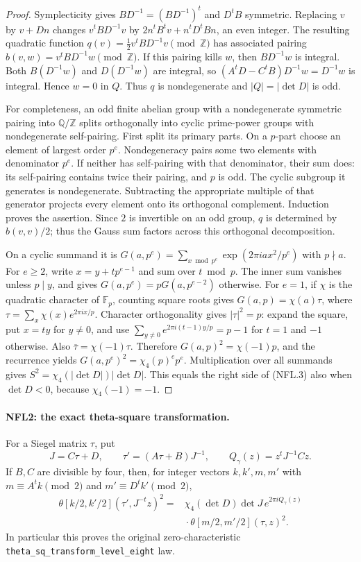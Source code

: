 \documentclass[11pt,a4paper]{article}
\numberwithin{equation}{section}
\theoremstyle{remark}\newtheorem{remark}[theorem]{Remark}
\begin{document}
\begin{proof}
Symplecticity gives $BD^{-1}=(BD^{-1})^t$ and $D^tB$ symmetric.
Replacing $v$ by $v+Dn$ changes $v^tBD^{-1}v$ by
$2n^tB^tv+n^tD^tBn$, an even integer.  The resulting quadratic
function $q(v)=\tfrac12v^tBD^{-1}v\pmod{\mathbb Z}$ has associated
pairing $b(v,w)=v^tBD^{-1}w\pmod{\mathbb Z}$.
If this pairing kills $w$, then $BD^{-1}w$ is integral.  Both
$B(D^{-1}w)$ and $D(D^{-1}w)$ are integral, so
$(A^tD-C^tB)D^{-1}w=D^{-1}w$ is integral.  Hence $w=0$ in $Q$.
Thus $q$ is nondegenerate and $|Q|=|\det D|$ is odd.

For completeness, an odd finite abelian group with a nondegenerate
symmetric pairing into $\mathbb Q/\mathbb Z$ splits orthogonally
into cyclic prime-power groups with nondegenerate self-pairing.
First split its primary parts.  On a $p$-part choose an element of
largest order $p^e$.  Nondegeneracy pairs some two elements with
denominator $p^e$.  If neither has self-pairing with that denominator,
their sum does: its self-pairing contains twice their pairing, and
$p$ is odd.  The cyclic subgroup it generates is nondegenerate.
Subtracting the appropriate multiple of that generator projects
every element onto its orthogonal complement.  Induction proves
the assertion.  Since $2$ is invertible on an odd group, $q$ is
determined by $b(v,v)/2$; thus the Gauss sum factors across this
orthogonal decomposition.

On a cyclic summand it is
$G(a,p^e)=\sum_{x\bmod p^e}\exp(2\pi i ax^2/p^e)$ with $p\nmid a$.
For $e\ge2$, write $x=y+tp^{e-1}$ and sum over $t\bmod p$.
The inner sum vanishes unless $p\mid y$, and gives
$G(a,p^e)=pG(a,p^{e-2})$ otherwise.  For $e=1$, if $\chi$ is the
quadratic character of $\mathbb F_p$, counting square roots gives
$G(a,p)=\chi(a)\tau$, where
$\tau=\sum_x\chi(x)e^{2\pi ix/p}$.
Character orthogonality gives $|\tau|^2=p$: expand the square,
put $x=ty$ for $y\ne0$, and use
$\sum_{y\ne0}e^{2\pi i(t-1)y/p}=p-1$ for $t=1$ and $-1$ otherwise.
Also $\overline\tau=\chi(-1)\tau$.  Therefore
$G(a,p)^2=\chi(-1)p$, and the recurrence yields
$G(a,p^e)^2=\chi_4(p)^e p^e$.
Multiplication over all summands gives
$S^2=\chi_4(|\det D|)|\det D|$.
This equals the right side of (NFL.3) also when $\det D<0$,
because $\chi_4(-1)=-1$.
\end{proof}

\paragraph{NFL2: the exact theta-square transformation.}
\label{claim:NFL2}
For a Siegel matrix $\tau$, put
\[
 J=C\tau+D,\qquad \tau'=(A\tau+B)J^{-1},
 \qquad Q_\gamma(z)=z^tJ^{-1}Cz.
\]
If $B,C$ are divisible by four, then, for integer vectors $k,k',m,m'$
with $m\equiv A^tk\pmod2$ and $m'\equiv D^tk'\pmod2$,
\[
 \begin{split}
 \theta[k/2,k'/2](\tau',J^{-t}z)^2
   ={}&\chi_4(\det D)\det J\,e^{2\pi iQ_\gamma(z)}\\
     &{}\cdot\theta[m/2,m'/2](\tau,z)^2.
 \end{split}
 \tag{NFL.4}
\]
In particular this proves the original zero-characteristic
\texttt{theta\_\allowbreak sq\_\allowbreak transform\_\allowbreak level\_\allowbreak eight} law.
\end{document}
